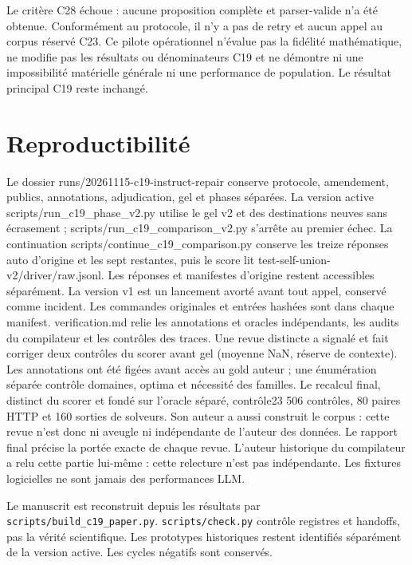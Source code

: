 \documentclass[11pt]{article}
\begin{document}
Le critère C28 échoue : aucune proposition complète et parser-valide n'a été obtenue. Conformément au protocole, il n'y a pas de retry et aucun appel au corpus réservé C23. Ce pilote opérationnel n'évalue pas la fidélité mathématique, ne modifie pas les résultats ou dénominateurs C19 et ne démontre ni une impossibilité matérielle générale ni une performance de population. Le résultat principal C19 reste inchangé.

\section{Reproductibilité}

Le dossier runs/20261115-c19-instruct-repair conserve protocole, amendement, publics, annotations, adjudication, gel et phases séparées. La version active scripts/run\_c19\_phase\_v2.py utilise le gel v2 et des destinations neuves sans écrasement ; scripts/run\_c19\_comparison\_v2.py s’arrête au premier échec. La continuation scripts/continue\_c19\_comparison.py conserve les treize réponses auto d’origine et les sept restantes, puis le score lit test-self-union-v2/driver/raw.jsonl. Les réponses et manifestes d’origine restent accessibles séparément. La version v1 est un lancement avorté avant tout appel, conservé comme incident. Les commandes originales et entrées hashées sont dans chaque manifest. verification.md relie les annotations et oracles indépendants, les audits du compilateur et les contrôles des traces. Une revue distincte a signalé et fait corriger deux contrôles du scorer avant gel (moyenne NaN, réserve de contexte). Les annotations ont été figées avant accès au gold auteur ; une énumération séparée contrôle domaines, optima et nécessité des familles. Le recalcul final, distinct du scorer et fondé sur l’oracle séparé, contrôle23 506 contrôles, 80 paires HTTP et 160 sorties de solveurs. Son auteur a aussi construit le corpus : cette revue n’est donc ni aveugle ni indépendante de l’auteur des données. Le rapport final précise la portée exacte de chaque revue. L’auteur historique du compilateur a relu cette partie lui-même : cette relecture n’est pas indépendante. Les fixtures logicielles ne sont jamais des performances LLM.

Le manuscrit est reconstruit depuis les résultats par \texttt{scripts/\allowbreak{}build\_\allowbreak{}c19\_\allowbreak{}paper.py}. \texttt{scripts/\allowbreak{}check.py} contrôle registres et handoffs, pas la vérité scientifique. Les prototypes historiques restent identifiés séparément de la version active. Les cycles négatifs sont conservés.
\end{document}
